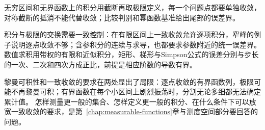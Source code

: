 无穷区间和无界函数上的积分用截断再取极限定义，每一个问题点都要单独收敛，对称截断的抵消不能代替收敛；比较判别和幂函数基准给出尾部的误差界。

积分与极限的交换需要一致控制：在有限区间上一致收敛允许逐项积分，窄峰的例子说明逐点收敛不够；含参积分的连续与求导，也都要求参数附近的统一误差界。
数值求积用带权的有限和近似积分，矩形、梯形与Simpson公式的误差分别与步长的一次、二次和四次方成正比，前提是相应阶数的导数有界。

黎曼可积性和一致收敛的要求在两处显出了局限：逐点收敛的有界函数列，极限可能不再黎曼可积；有界函数在每个小区间上剧烈振荡时，分割无论多细都无法确定累计值。
怎样测量更一般的集合、怎样定义更一般的积分、在什么条件下可以放宽一致收敛的要求，是第~\ref{chap:measurable-functions}章与测度空间部分要回答的问题。
